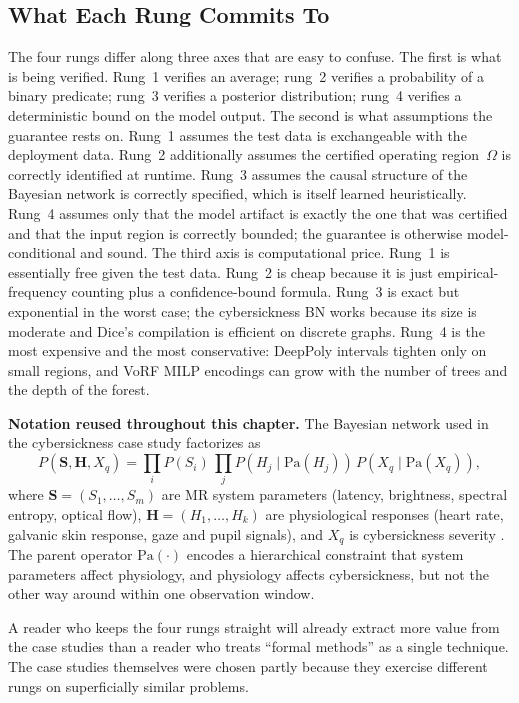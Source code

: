 \documentclass[graybox]{svmult}
\begin{document}
\subsection{What Each Rung Commits To}
\label{sec:rungs}

The four rungs differ along three axes that are easy to confuse. The first is what is being verified. Rung~1 verifies an average; rung~2 verifies a probability of a binary predicate; rung~3 verifies a posterior distribution; rung~4 verifies a deterministic bound on the model output. The second is what assumptions the guarantee rests on. Rung~1 assumes the test data is exchangeable with the deployment data. Rung~2 additionally assumes the certified operating region~$\Omega$ is correctly identified at runtime. Rung~3 assumes the causal structure of the Bayesian network is correctly specified, which is itself learned heuristically. Rung~4 assumes only that the model artifact is exactly the one that was certified and that the input region is correctly bounded; the guarantee is otherwise model-conditional and sound. The third axis is computational price. Rung~1 is essentially free given the test data. Rung~2 is cheap because it is just empirical-frequency counting plus a confidence-bound formula. Rung~3 is exact but exponential in the worst case; the cybersickness BN works because its size is moderate and Dice's compilation is efficient on discrete graphs. Rung~4 is the most expensive and the most conservative: DeepPoly intervals tighten only on small regions, and VoRF MILP encodings can grow with the number of trees and the depth of the forest.

\begin{svgraybox}
\textbf{Notation reused throughout this chapter.} The Bayesian network used in the cybersickness case study factorizes as
\[
P(\mathbf{S}, \mathbf{H}, X_q) = \prod_i P(S_i)\,\prod_j P(H_j \mid \mathrm{Pa}(H_j))\,P(X_q \mid \mathrm{Pa}(X_q)),
\]
where $\mathbf{S} = (S_1,\dots,S_m)$ are MR system parameters (latency, brightness, spectral entropy, optical flow), $\mathbf{H} = (H_1,\dots,H_k)$ are physiological responses (heart rate, galvanic skin response, gaze and pupil signals), and $X_q$ is cybersickness severity \citep{wu2025cybersickness_bn}. The parent operator $\mathrm{Pa}(\cdot)$ encodes a hierarchical constraint that system parameters affect physiology, and physiology affects cybersickness, but not the other way around within one observation window.
\end{svgraybox}

A reader who keeps the four rungs straight will already extract more value from the case studies than a reader who treats ``formal methods'' as a single technique. The case studies themselves were chosen partly because they exercise different rungs on superficially similar problems.
\end{document}
